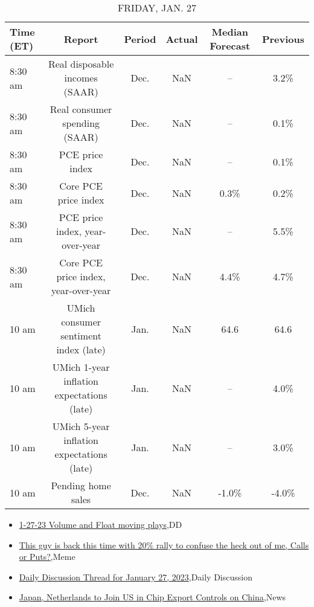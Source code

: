 \documentclass{article}%
\begin{document}
\begin{table}[htbp]%
\caption{FRIDAY, JAN. 27}%
\centering%
\begin{adjustbox}{width=1\textwidth}%
\begin{tabular}{lccccc}
\toprule
Time (ET) &                                     Report & Period & Actual & Median Forecast & Previous \\
\midrule
  8:30 am &             Real disposable incomes (SAAR) &   Dec. &    NaN &              -- &     3.2\% \\
  8:30 am &              Real consumer spending (SAAR) &   Dec. &    NaN &              -- &     0.1\% \\
  8:30 am &                            PCE price index &   Dec. &    NaN &              -- &     0.1\% \\
  8:30 am &                       Core PCE price index &   Dec. &    NaN &            0.3\% &     0.2\% \\
  8:30 am &            PCE price index, year-over-year &   Dec. &    NaN &              -- &     5.5\% \\
  8:30 am &       Core PCE price index, year-over-year &   Dec. &    NaN &            4.4\% &     4.7\% \\
    10 am &      UMich consumer sentiment index (late) &   Jan. &    NaN &            64.6 &     64.6 \\
    10 am & UMich 1-year inflation expectations (late) &   Jan. &    NaN &              -- &     4.0\% \\
    10 am & UMich 5-year inflation expectations (late) &   Jan. &    NaN &              -- &     3.0\% \\
    10 am &                         Pending home sales &   Dec. &    NaN &           -1.0\% &    -4.0\% \\
\bottomrule
\end{tabular}
%
\end{adjustbox}%
\end{table}

%
\begin{itemize}%
\item%
\href{https://reddit.com/r/wallstreetbets/comments/10mjmy4/12723\_volume\_and\_float\_moving\_plays/}{1-27-23 Volume and Float moving plays},DD%
\item%
\href{https://reddit.com/r/wallstreetbets/comments/10mipon/this\_guy\_is\_back\_this\_time\_with\_20\_rally\_to/}{This guy is back this time with 20\% rally to confuse the heck out of me, Calls or Puts?},Meme%
\item%
\href{https://reddit.com/r/wallstreetbets/comments/10mi67h/daily\_discussion\_thread\_for\_january\_27\_2023/}{Daily Discussion Thread for January 27, 2023},Daily Discussion%
\item%
\href{https://reddit.com/r/Economics/comments/10m9ue4/japan\_netherlands\_to\_join\_us\_in\_chip\_export/}{Japan, Netherlands to Join US in Chip Export Controls on China},News%
\end{itemize}%
\end{document}
